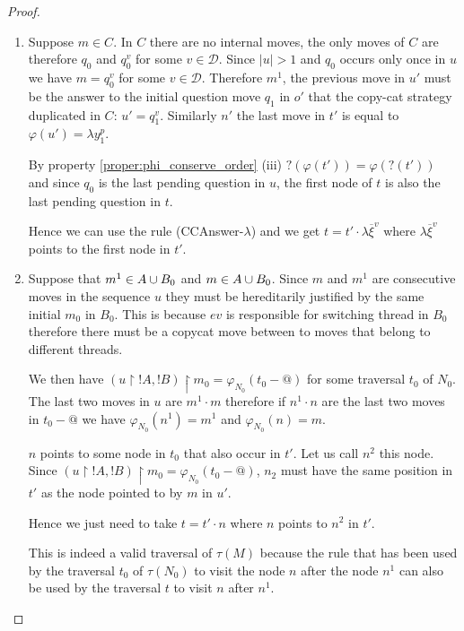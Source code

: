 \begin{proof}
\begin{itemize}
    \begin{enumerate}
    \item Suppose $m \in C$. In $C$ there are no internal moves, the only moves of $C$ are therefore $q_0$ and
    $q_0^v$ for some $v\in\mathcal{D}$. Since $|u|>1$ and $q_0$ occurs only once in $u$ we have $m = q_0^v$
    for some $v\in \mathcal{D}$.  Therefore $m^1$, the previous move in $u'$ must be the answer to the initial question move
    $q_1$ in $o'$ that the copy-cat strategy duplicated in $C$: $u'=q_1^v$. Similarly $n'$ the last move in $t'$ is equal to
    $\varphi(u') = \lambda y_1^p$.

    By property \ref{proper:phi_conserve_order} (iii) $?(\varphi(t')) = \varphi(?(t'))$ and
    since $q_0$ is the last pending question in $u$,
    the first node of $t$ is also the last pending question in $t$.

    Hence we can use the rule (CCAnswer-$\lambda$) and we get $t = t' \cdot \lambda \overline{\xi}^v$
    where $\lambda \overline{\xi}^v$ points to the first node in $t'$.

    \item Suppose that $m^1 \in A \cup B_0$ and $m \in A \cup B_0$.
    Since $m$ and $m^1$ are consecutive moves in the sequence $u$ they must be hereditarily justified by the same initial
    $m_0$ in $B_0$. This is because $ev$ is responsible for switching thread in $B_0$ therefore there must be a copycat
    move between to moves that belong to different threads.

    We then have $(u \upharpoonright !A, !B)\upharpoonright m_0 = \varphi_{N_0}(t_0-@)$ for some traversal $t_0$ of $N_0$.
    The last two moves in $u$ are $m^1 \cdot m$ therefore
    if $n^1 \cdot n$ are the last two moves in $t_0-@$ we have
    $\varphi_{N_0}(n^1) = m^1$ and $\varphi_{N_0}(n) = m$.

    $n$ points to some node in $t_0$ that also occur in $t'$. Let us call $n^2$ this node.
    Since $(u \upharpoonright !A, !B)\upharpoonright m_0 = \varphi_{N_0}(t_0-@)$,
    $n_2$ must have the same position in $t'$ as the node pointed to by $m$ in $u'$.

    Hence we just need to take $t = t' \cdot n$ where $n$ points to $n^2$ in $t'$.

    This is indeed a valid traversal of $\tau(M)$
    because the rule that has been used by the traversal $t_0$
    of $\tau(N_0)$ to visit the node $n$ after the node $n^1$ can also be used by the traversal $t$ to visit $n$ after $n^1$.


\end{enumerate}
\end{itemize}
\end{proof}
